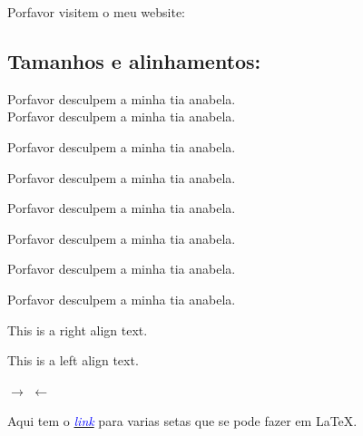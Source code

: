 \documentclass[a4paper,20pt,hidelinks]{article}
\begin{document}
Porfavor visitem o meu website: 
\subsection{Tamanhos e alinhamentos:}
\begin{center}

Porfavor desculpem a minha tia anabela.\\

\tiny
Porfavor desculpem a minha tia anabela.

\small
Porfavor desculpem a minha tia anabela.

\normalsize
Porfavor desculpem a minha tia anabela.

\large
Porfavor desculpem a minha tia anabela.

\Large
Porfavor desculpem a minha tia anabela.

\huge
Porfavor desculpem a minha tia anabela.

\Huge
Porfavor desculpem a minha tia anabela.

\end{center}

\begin{flushright}

 This is a right align text.
\end{flushright}

\begin{flushleft}
 This is a left align text.
\end{flushleft}

$\rightarrow$
$\leftarrow$

Aqui tem o \href{http://www.sascha-frank.com/Arrow/latex-arrows.html}{\textit{\textcolor{blue}{link}}} para varias setas que se pode fazer em \LaTeX{}.
\end{document}
